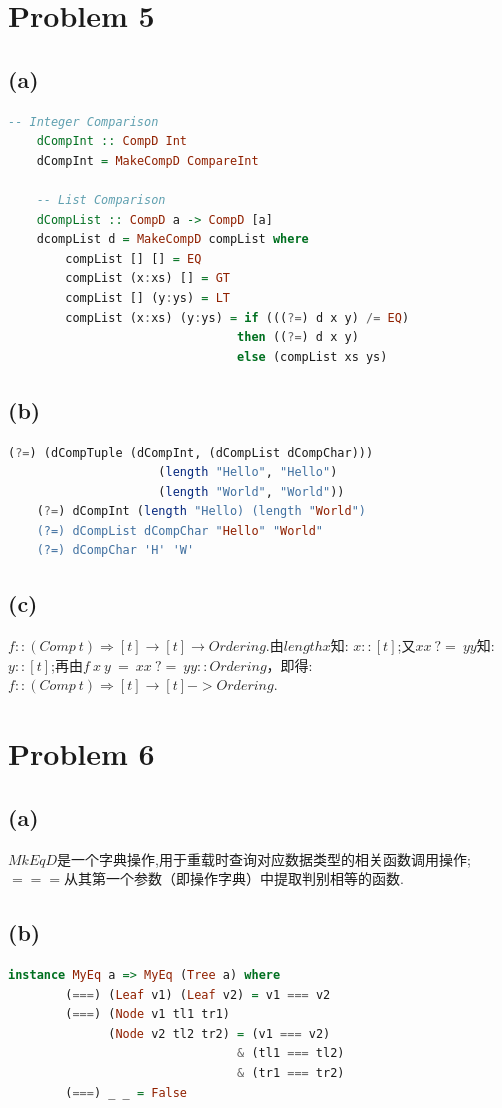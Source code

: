 \documentclass{paper}
\begin{document}
\section*{Problem 5}
\subsection*{(a)}
	\begin{lstlisting}[language=Haskell]
	-- Integer Comparison
	dCompInt :: CompD Int
	dCompInt = MakeCompD CompareInt
	
	-- List Comparison
	dCompList :: CompD a -> CompD [a]
	dcompList d = MakeCompD compList where
		compList [] [] = EQ
		compList (x:xs) [] = GT
		compList [] (y:ys) = LT
		compList (x:xs) (y:ys) = if (((?=) d x y) /= EQ)
								then ((?=) d x y)
								else (compList xs ys)
	\end{lstlisting}		
	
\subsection*{(b)}
	\begin{lstlisting}[language=Haskell]
	(?=) (dCompTuple (dCompInt, (dCompList dCompChar))) 
					 (length "Hello", "Hello") 
					 (length "World", "World"))
	(?=) dCompInt (length "Hello) (length "World")
	(?=) dCompList dCompChar "Hello" "World"
	(?=) dCompChar 'H' 'W'
	\end{lstlisting}

\subsection*{(c)} $f :: (Comp\ t) \Rightarrow [t] \rightarrow [t] \rightarrow Ordering$.由$length x$知: $x :: [t]$;又$xx\ ?=\ yy$知: $y :: [t]$;再由$f\ x\ y\ =\ xx\ ?=\ yy :: Ordering$，即得:$f :: (Comp\ t) \Rightarrow [t] \rightarrow [t] -> Ordering$.

\section*{Problem 6}
\subsection*{(a)} $MkEqD$是一个字典操作,用于重载时查询对应数据类型的相关函数调用操作;$===$从其第一个参数（即操作字典）中提取判别相等的函数.

\subsection*{(b)}
	\begin{lstlisting}[language=Haskell]
	instance MyEq a => MyEq (Tree a) where
		(===) (Leaf v1) (Leaf v2) = v1 === v2
		(===) (Node v1 tl1 tr1) 
			  (Node v2 tl2 tr2) = (v1 === v2) 
			  					& (tl1 === tl2) 
			  				    & (tr1 === tr2)
		(===) _ _ = False
	\end{lstlisting}
\end{document}
